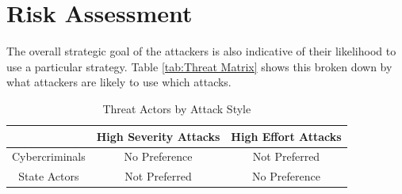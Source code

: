 \documentclass[12pt]{article}
\begin{document}
\section{Risk Assessment}




 The overall strategic goal of the attackers is also indicative of their likelihood to use a particular strategy. Table \ref{tab:Threat Matrix} shows this broken down by what attackers are likely to use which attacks. 

\newpage

\begin{table}
    \centering
    \begin{tabular}{|c|c|c|}
    \hline
         &High Severity Attacks& High Effort Attacks \\
         \hline
       Cybercriminals  & No Preference & Not Preferred\\
         \hline
        State Actors & Not Preferred & No Preference\\
         \hline
    \end{tabular}
    \caption{Threat Actors by Attack Style}
    \label{tab:Severity Matrix}
\end{table}
\end{document}

